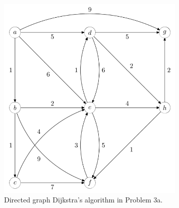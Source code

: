 \documentclass[a4paper,12pt]{article}
\begin{document}
\section[Question 2]{}
\subsection[]{}



\subsection[]{}



\subsection[]{}



\subsection[]{}



\begin{figure}[H]
    \centering
    \includegraphics[width=0.8\textwidth]{3.png}
    \caption{Directed graph Dijkstra's algorithm in Problem 3a.}
\end{figure}
\section[Question 3]{}
\end{document}
